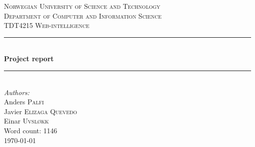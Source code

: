 \documentclass[11pt,a4paper]{report}
\newcommand{\HRule}{\rule{\linewidth}{0.5mm}}
\begin{document}
\begin{titlepage}
\center
\textsc{\Large Norwegian University of Science and Technology}\\[1.5cm]
\textsc{\large Department of Computer and Information Science}\\[0.5cm]
\textsc{TDT4215 Web-intelligence}\\[0.5cm]

\HRule \\[0.5cm]
{\huge \bfseries Project report}\\[0.2cm]
\HRule \\[1.5cm]

\Large \emph{Authors:}\\
Anders \textsc{Palfi}\\
Javier \textsc{Elizaga Quevedo}\\
Einar \textsc{Uvsløkk}\\[3cm]

{\large Word count: 1146}\\
{\large \today}\\[3cm]

\vfill

\end{titlepage}


\tableofcontents

\listoffigures
{}














\end{document}
